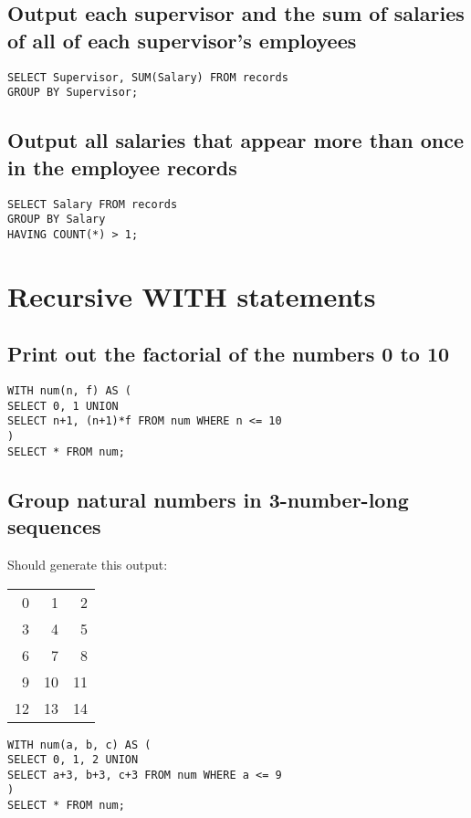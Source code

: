 \documentclass[11pt]{article}
\begin{document}
\subsection{Output each supervisor and the sum of salaries of all of each supervisor's employees}
\label{sec-1-11}
\begin{verbatim}
SELECT Supervisor, SUM(Salary) FROM records
GROUP BY Supervisor;
\end{verbatim}

\subsection{Output all salaries that appear more than once in the employee records}
\label{sec-1-12}
\begin{verbatim}
SELECT Salary FROM records
GROUP BY Salary
HAVING COUNT(*) > 1;
\end{verbatim}

\section{Recursive WITH statements}
\label{sec-2}
\subsection{Print out the factorial of the numbers 0 to 10}
\label{sec-2-1}
\begin{verbatim}
WITH num(n, f) AS (
SELECT 0, 1 UNION
SELECT n+1, (n+1)*f FROM num WHERE n <= 10
)
SELECT * FROM num;
\end{verbatim}

\subsection{Group natural numbers in 3-number-long sequences}
\label{sec-2-2}
Should generate this output:
\begin{center}
\begin{tabular}{rrr}
0 & 1 & 2\\
3 & 4 & 5\\
6 & 7 & 8\\
9 & 10 & 11\\
12 & 13 & 14\\
\end{tabular}
\end{center}
\begin{verbatim}
WITH num(a, b, c) AS (
SELECT 0, 1, 2 UNION
SELECT a+3, b+3, c+3 FROM num WHERE a <= 9
)
SELECT * FROM num;
\end{verbatim}
\end{document}
